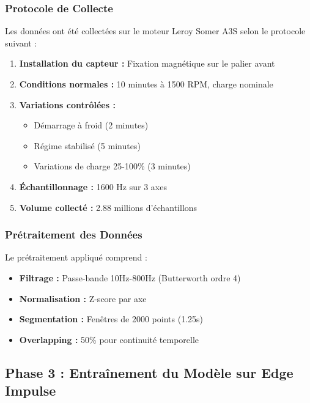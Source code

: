 \subsubsection{Protocole de Collecte}

Les données ont été collectées sur le moteur Leroy Somer A3S selon le protocole suivant :

\begin{enumerate}
    \item \textbf{Installation du capteur :} Fixation magnétique sur le palier avant
    \item \textbf{Conditions normales :} 10 minutes à 1500 RPM, charge nominale
    \item \textbf{Variations contrôlées :} 
        \begin{itemize}
            \item Démarrage à froid (2 minutes)
            \item Régime stabilisé (5 minutes)
            \item Variations de charge 25-100\% (3 minutes)
        \end{itemize}
    \item \textbf{Échantillonnage :} 1600 Hz sur 3 axes
    \item \textbf{Volume collecté :} 2.88 millions d'échantillons
\end{enumerate}

\subsubsection{Prétraitement des Données}

Le prétraitement appliqué comprend :

\begin{itemize}
    \item \textbf{Filtrage :} Passe-bande 10Hz-800Hz (Butterworth ordre 4)
    \item \textbf{Normalisation :} Z-score par axe
    \item \textbf{Segmentation :} Fenêtres de 2000 points (1.25s)
    \item \textbf{Overlapping :} 50\% pour continuité temporelle
\end{itemize}

\subsection{Phase 3 : Entraînement du Modèle sur Edge Impulse}

